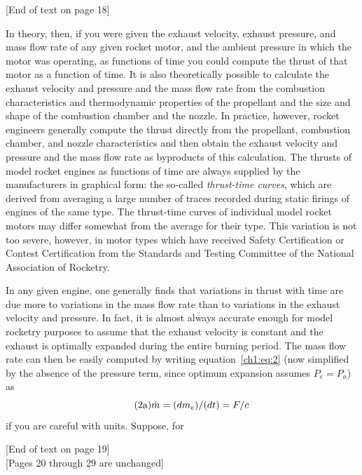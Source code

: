 \begin{center}
[End of text on page 18]

\end{center}

In theory, then, if you were given the exhaust velocity, exhaust pressure, and mass flow rate of any given
rocket motor, and the ambient pressure in which the motor was operating, as functions of time you could
compute the thrust of that motor as a function of time. It is also theoretically possible to calculate the
exhaust velocity and pressure and the mass flow rate from the combustion characteristics and thermodynamic
properties of the propellant and the size and shape of the combustion chamber and the nozzle. In practice,
however, rocket engineers generally compute the thrust directly from the propellant, combustion chamber, and
nozzle characteristics and then obtain the exhaust velocity and pressure and the mass flow rate as
byproducts of this calculation. The thrusts of model rocket engines as functions of time are always
supplied by the manufacturers in graphical form: the so-called \emph{thrust-time curves}, which are derived
from averaging a large number of traces recorded during static firings of engines of the same type. The
thrust-time curves of individual model rocket motors may differ somewhat from the average for their type.
This variation is not too severe, however, in motor types which have received Safety Certification or
Contest Certification from the Standards and Testing Committee of the National Association of Rocketry.

In any given engine, one generally finds that variations in thrust with time are due more to variations in
the mass flow rate than to variations in the exhaust velocity and pressure. In fact, it is almost always
accurate enough for model rocketry purposes to assume that the exhaust velocity is constant and the exhaust
is optimally expanded during the entire burning period. The mass flow rate can then be easily computed by
writing equation~\eqref{ch1:eq:2} (now simplified by the absence of the pressure term, since optimum
expansion assumes $P_e = P_a$) as
\begin{equation*}\tag{2a}
\dot{m} = (dm_e)/(dt) = F/c
\end{equation*}
if you are careful with units. Suppose, for

\begin{center}
[End of text on page 19]\\
{[Pages 20 through 29 are unchanged]}

\end{center}

